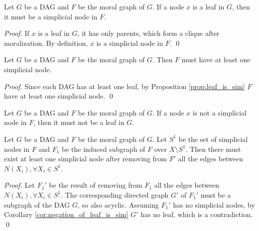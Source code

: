 \begin{proposition}
\label{prop:leaf_is_sim}
Let $G$ be a DAG and $F$ be the moral graph of $G$. If a node $x$ is a leaf in $G$, then it must be a simplicial node in $F$. 
\end{proposition}
\begin{proof}
If $x$ is a leaf in $G$, it has only parents, which form a clique after moralization. By definition, $x$ is a simplicial node in $F$. \qed
\end{proof}

\begin{corollary}
Let $G$ be a DAG and $F$ be the moral graph of $G$. Then $F$ must have at least one simplicial node. 
\end{corollary}

\begin{proof}
Since each DAG has at least one leaf, by Proposition \ref{prop:leaf_is_sim} $F$ have at least one simplicial node. \qed
\end{proof}

\begin{corollary}
\label{cor:negation_of_leaf_is_sim}
Let $G$ be a DAG and $F$ be the moral graph of $G$. If a node $x$ is not a simplicial node in $F$, then it must not be a leaf in $G$. 
\end{corollary}

\begin{proposition}
Let $G$ be a DAG and $F$ be the moral graph of $G$. Let $S^1$ be the set of simplicial nodes in $F$ and $F_1$ be the induced subgraph of $F$ over $X\setminus S^1$. Then there must exist at least one simplicial node after removing from $F'$ all the edges between $N(X_i), \forall X_i \in S^1$.
\end{proposition}

\begin{proof}
Let $F_1'$ be the result of removing from $F_1$ all the edges between $N(X_i), \forall X_i \in S^1$. The corresponding directed graph $G'$ of $F_1'$ must be a subgraph of the DAG $G$, so also acyclic. Assuming $F_1'$ has no simplicial nodes, by Corollary \ref{cor:negation_of_leaf_is_sim} $G'$ has no leaf, which is a contradiction. \qed
\end{proof}


